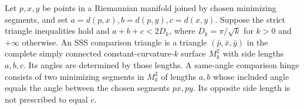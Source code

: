 Let \(p,x,y\) be points in a Riemannian manifold joined by chosen minimizing segments, and set \(a=d(p,x), b=d(p,y), c=d(x,y)\). Suppose the strict triangle inequalities hold and \(a+b+c<2D_k\), where \(D_k=\pi/\sqrt{k}\) for \(k>0\) and \(+\infty\) otherwise.
An SSS comparison triangle is a triangle \((\bar p,\bar x,\bar y)\) in the complete simply connected constant-curvature-\(k\) surface \(M_k^2\) with side lengths \(a,b,c\). Its angles are determined by those lengths.
A same-angle comparison hinge consists of two minimizing segments in \(M_k^2\) of lengths \(a,b\) whose included angle equals the angle between the chosen segments \(px,py\). Its opposite side length is not prescribed to equal \(c\).
